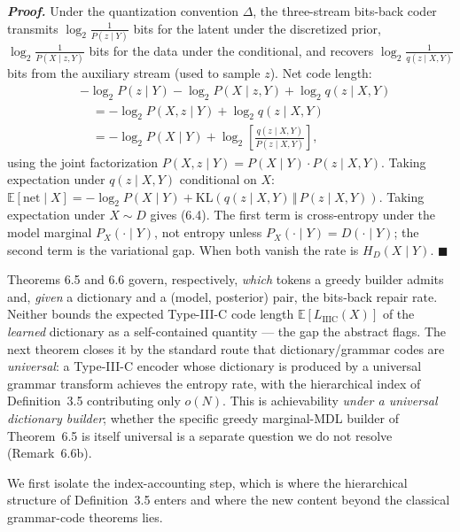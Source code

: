 \documentclass[
]{article}
\begin{document}
\emph{\textbf{Proof.}} Under the quantization convention $\Delta$,
the three-stream bits-back coder transmits
$\log_2 \tfrac{1}{P(z \mid Y)}$ bits for the latent under the
discretized prior, $\log_2 \tfrac{1}{P(X \mid z, Y)}$ bits for the
data under the conditional, and recovers
$\log_2 \tfrac{1}{q(z \mid X, Y)}$ bits from the auxiliary stream
(used to sample $z$). Net code length:
\[
\begin{aligned}
&-\log_2 P(z \mid Y) - \log_2 P(X \mid z, Y) + \log_2 q(z \mid X, Y) \\
&\quad= -\log_2 P(X, z \mid Y) + \log_2 q(z \mid X, Y) \\
&\quad= -\log_2 P(X \mid Y) + \log_2 \!\left[\frac{q(z \mid X, Y)}{P(z \mid X, Y)}\right],
\end{aligned}
\]
using the joint factorization
$P(X, z \mid Y) = P(X \mid Y) \cdot P(z \mid X, Y)$. Taking
expectation under $q(z \mid X, Y)$ conditional on $X$:
$\mathbb{E}[\text{net} \mid X] = -\log_2 P(X \mid Y) + \mathrm{KL}(q(z \mid X, Y) \,\Vert\, P(z \mid X, Y))$.
Taking expectation under $X \sim D$ gives (6.4). The first term is
cross-entropy under the model marginal $P_X(\cdot \mid Y)$, not
entropy unless $P_X(\cdot \mid Y) = D(\cdot \mid Y)$; the second
term is the variational gap. When both vanish the rate is
$H_D(X \mid Y)$. \hfill$\blacksquare$

Theorems 6.5 and 6.6 govern, respectively, \emph{which} tokens a
greedy builder admits and, \emph{given} a dictionary and a (model,
posterior) pair, the bits-back repair rate. Neither bounds the
expected Type-III-C code length $\mathbb{E}[L_{\mathrm{IIIC}}(X)]$ of
the \emph{learned} dictionary as a self-contained quantity --- the gap
the abstract flags. The next theorem closes it by the standard route
that dictionary/grammar codes are \emph{universal}: a Type-III-C
encoder whose dictionary is produced by a universal grammar transform
achieves the entropy rate, with the hierarchical index of
Definition~3.5 contributing only $o(N)$. This is achievability
\emph{under a universal dictionary builder}; whether the specific
greedy marginal-MDL builder of Theorem~6.5 is itself universal is a
separate question we do not resolve (Remark~6.6b).

We first isolate the index-accounting step, which is where the
hierarchical structure of Definition~3.5 enters and where the new
content beyond the classical grammar-code theorems lies.
\end{document}
